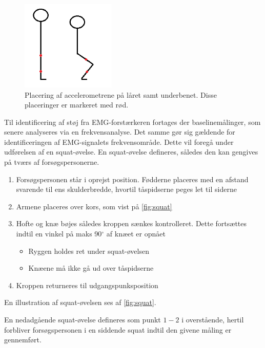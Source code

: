 \begin{figure}[H]
\centering
\includegraphics[width=0.4\textwidth]{figures/accelerometervinkel.png}
\caption{Placering af accelerometrene på låret samt underbenet. Disse placeringer er markeret med rød.}
\label{fig:accelerometervinkel}
\end{figure}

Til identificering af støj fra EMG-forstærkeren fortages der baselinemålinger, som senere analyseres via en frekvensanalyse. Det samme gør sig gældende for identificeringen af EMG-signalets frekvensområde. Dette vil foregå under udførelsen af en squat-øvelse.
En squat-øvelse defineres, således den kan gengives på tværs af forsøgspersonerne.\vspace{3mm}
\begin{enumerate}
\item Forsøgspersonen står i oprejst position. Fødderne placeres med en afstand svarende til ens skulderbredde, hvortil tåspidserne peges let til siderne
\item Armene placeres over kors, som vist på \autoref{fig:squat}
\item Hofte og knæ bøjes således kroppen sænkes kontrolleret. Dette fortsættes indtil en vinkel på maks 90$^{\circ}$ af knæet er opnået
	\begin{itemize}
	\item Ryggen holdes ret under squat-øvelsen 
	\item Knæene må ikke gå ud over tåspidserne 
	\end{itemize}
\item Kroppen returneres til udgangspunksposition
\end{enumerate} \vspace{3mm}
En illustration af squat-øvelsen ses af \autoref{fig:squat}.

En nedadgående squat-øvelse defineres som punkt $1-2$ i overstående, hertil forbliver forsøgspersonen i en siddende squat indtil den givene måling er gennemført.

